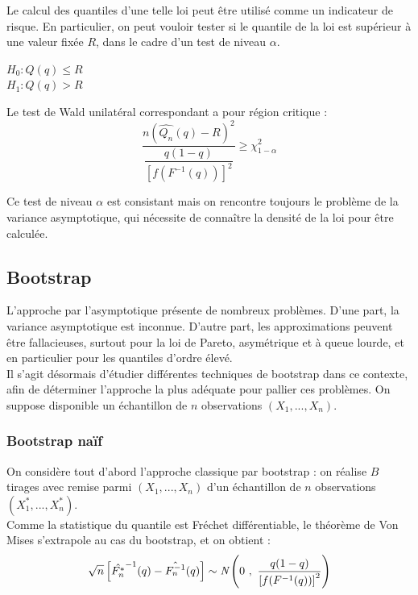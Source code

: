 \documentclass{article}
\renewcommand*{\(}{ \left( }
\renewcommand*{\)}{ \right) }
\begin{document}
Le calcul des quantiles d'une telle loi peut être utilisé comme un indicateur de risque. En particulier, on peut vouloir tester si le quantile de la loi est supérieur à une valeur fixée $R$, dans le cadre d'un test de niveau $\alpha$.\\
\begin{center}
$H_0 : Q(q) \leq R$\\
$H_1 : Q(q) > R$\\
\end{center}
Le test de Wald unilatéral correspondant a pour région critique :  \\

\[\frac{n(\hat{Q_n}(q)-R)^2}{\dfrac{q(1-q)}{[f(F^{-1}(q))]^2}} \geq \chi^2_{1-\alpha}\]

Ce test de niveau $\alpha$ est consistant mais on rencontre toujours le problème de la variance asymptotique, qui nécessite de connaître la densité de la loi pour être calculée.

\subsection{Bootstrap}
L'approche par l'asymptotique présente de nombreux problèmes.
D'une part, la variance asymptotique est inconnue. D'autre part, les approximations peuvent être fallacieuses, surtout pour la loi de Pareto, asymétrique et à queue lourde, et en particulier pour les quantiles d'ordre élevé.\\

Il s'agit désormais d'étudier différentes techniques de bootstrap dans ce contexte, afin de déterminer l'approche la plus adéquate pour pallier ces problèmes. On suppose disponible un échantillon de $n$ observations $(X_1, ..., X_n)$.

\subsubsection{Bootstrap naïf}
On considère tout d'abord l'approche classique par bootstrap : on réalise $B$ tirages avec remise parmi $(X_1, ..., X_n)$ d'un échantillon de $n$ observations $(X^*_1, ..., X^*_n)$.\\

Comme la statistique du quantile est Fréchet différentiable, le théorème de Von Mises s'extrapole au cas du bootstrap, et on obtient :
\[
\sqrt{n}\left[ \hat{F_n^*}^{-1}(q)-\hat{F_n^{-1}}(q) \right] \sim \emph{N} \left( 0 ~ , ~ \frac{q(1-q)}{\left[f(F^{-1}(q))\right]^2}\right)
\]
\end{document}
